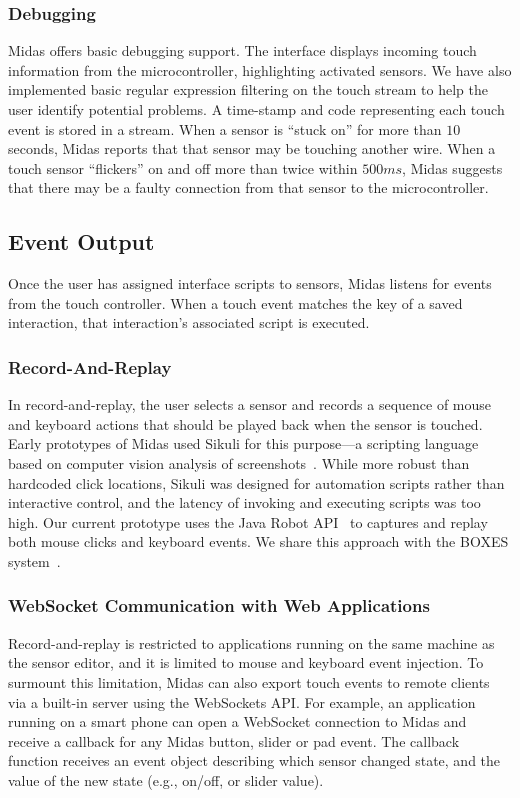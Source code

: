 \subsubsection{Debugging}

Midas offers basic debugging support. The interface displays incoming touch information from the microcontroller, highlighting activated sensors.  We have also implemented basic regular expression filtering on the touch stream to help the user identify potential problems.  A time-stamp and code representing each touch event is stored in a stream.  When a sensor is ``stuck on'' for more than $10$ seconds, Midas reports that that sensor may be touching another wire.  When a touch sensor ``flickers'' on and off more than twice within $500ms$, Midas suggests that there may be a faulty connection from that sensor to the microcontroller.

\subsection{Event Output}
Once the user has assigned interface scripts to sensors, Midas listens for events from the touch controller. When a touch event matches the key of a saved interaction, that interaction's associated script is executed.

\subsubsection{Record-And-Replay}

In record-and-replay, the user selects a sensor and records a sequence of mouse and keyboard actions that should be played back when the sensor is touched. Early prototypes of Midas used Sikuli for this purpose---a scripting language based on computer vision analysis of screenshots~\cite{yeh-sikuli}. While more robust than hardcoded click locations, Sikuli was designed for automation scripts rather than interactive control, and the latency of invoking and executing scripts was too high. Our current prototype uses the Java Robot API~\cite{robots} to captures and replay both mouse clicks and keyboard events. We share this approach with the BOXES system~\cite{hudson-boxes}.

\subsubsection{WebSocket Communication with Web Applications}

Record-and-replay is restricted to applications running on the same machine as the sensor editor, and it is limited to mouse and keyboard event injection. To surmount this limitation, Midas can also export touch events to remote clients via a built-in server using the WebSockets API. For example, an application running on a smart phone can open a WebSocket connection to Midas and receive a callback for any Midas button, slider or pad event. The callback function receives an event object describing which sensor changed state, and the value of the new state (e.g., on/off, or slider value).

